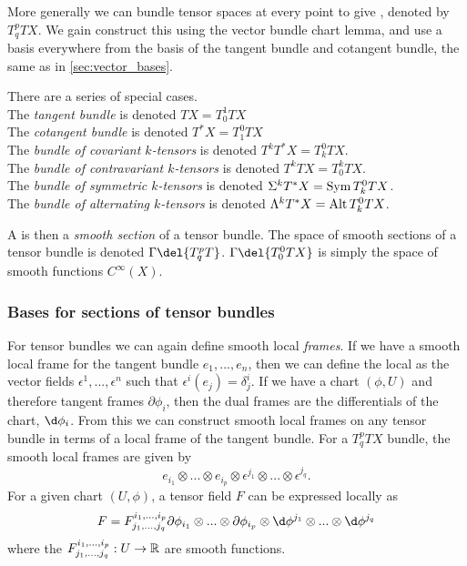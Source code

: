 More generally we can bundle tensor spaces at every point to give , denoted by \(T^p_qTX\).
We gain construct this using the vector bundle chart lemma, and use a basis everywhere from the basis of the tangent bundle and cotangent bundle, the same as in \cref{sec:vector_bases}.

There are a series of special cases.\\
The \emph{tangent bundle} is denoted \(TX = T^1_0TX\)\\
The \emph{cotangent bundle} is denoted \(T^*X = T^0_1TX\)\\
The \emph{bundle of covariant \(k\)-tensors} is denoted \(T^kT^*X = T^0_kTX\).\\
The \emph{bundle of contravariant \(k\)-tensors} is denoted \(T^kTX = T^k_0TX\).\\
The \emph{bundle of symmetric \(k\)-tensors} is denoted \(\Sigma^kT^*X = \operatorname{Sym} T^0_kTX\).\\
The \emph{bundle of alternating \(k\)-tensors} is denoted \(\Lambda^kT^*X = \operatorname{Alt} T^0_kTX\).

A  is then a \emph{smooth section} of a tensor bundle.
The space of smooth sections of a tensor bundle is denoted \(\Gamma\del{T^p_qT}\).
\(\Gamma\del{T^0_0TX}\) is simply the space of smooth functions \(C^\infty(X)\).

\subsubsection{Bases for sections of tensor bundles}

For tensor bundles we can again define smooth local \emph{frames}.
If we have a smooth local frame for the tangent bundle \(e_1, ..., e_n\), then we can define the local  as the vector fields \(\epsilon^1, ..., \epsilon^n\) such that \(\epsilon^i(e_j) = \delta^i_j\).
If we have a chart \((\phi, U)\) and therefore tangent frames \(\partial \phi_i\), then the dual frames are the differentials of the chart, \(\d\phi_i\).
From this we can construct smooth local frames on any tensor bundle in terms of a local frame of the tangent bundle. 
For a \(T^p_q TX\) bundle, the smooth local frames are given by 
\[
	e_{i_1} \otimes ...\otimes e_{i_p} \otimes \epsilon^{j_1} \otimes ... \otimes \epsilon^{j_q}	
.\]
For a given chart \((U, \phi)\), a tensor field \(F\) can be expressed locally as
\[
	F = F_{j_1, ..., j_q}^{i_1, ..., i_p} \partial\phi_{i_1} \otimes ...\otimes \partial\phi_{i_p} \otimes \d\phi^{j_1} \otimes ... \otimes \d\phi^{j_q}	
\]
where the \(F_{j_1, ..., j_q}^{i_1, ..., i_p}: U \to \mathbb{R}\) are smooth functions.

